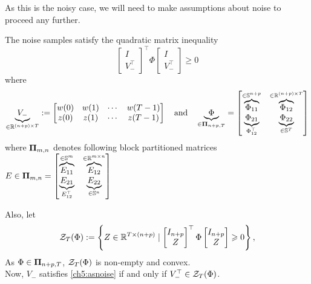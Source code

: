 As this is the noisy case, we will need to make assumptions about noise to proceed any further.
\begin{assumption} \label{ch5:assumption on noise samples}
The noise samples satisfy the quadratic matrix inequality
\begin{equation} 
    \label{ch5:asnoise}
    \begin{bmatrix}
    I \\ V_-^\top 
    \end{bmatrix}^\top 
    \Phi
    \begin{bmatrix}
    I \\ V_-^\top 
    \end{bmatrix} \geq 0
\end{equation}
where
\begin{equation} \label{ch5:eq:Phi}
\underbrace{V_-}_{\in\mathbb{R}^{(n+p)\times T}} := \bbm w(0) & w(1) & \cdots & w(T-1) \\  z(0) & z(1)  & \cdots & z(T-1)    \ebm \quad\text{and}\quad\underbrace{\Phi}_{\in \bpi_{n +p, T}} = \bbm \overbrace{\Phi_{11}}^{\in \S{n + p}}  & \overbrace{\Phi_{12}}^{\in \mathbb{R}^{(n + p) \times T}} \\ \underbrace{\Phi_{21}}_{\Phi_{12}^\top} & \underbrace{\Phi_{22}}_{\in \S{T}} \ebm
\end{equation}
where $\mathbf{\Pi}_{m,n}$ denotes following block partitioned matrices $E\in\mathbf{\Pi}_{m,n}=\begin{bmatrix} \overbrace{E_{11}}^{\in \mathbb{S}^{m}}  & \overbrace{E_{12}}^{\in \mathbb{R}^{m \times n}} \\ \underbrace{E_{21}}_{E_{12}^\top} & \underbrace{E_{22}}_{\in \mathbb{S}^{n}} \end{bmatrix}$

Also, let
\begin{equation} \label{ch0:e:Zr}
\calZ_{T}(\Phi):=\left\{ Z\in\R^{T\times {(n+p)}} \mid \bbm I_{n+p}\\Z\ebm^\top\Phi\bbm I_{n+p}\\Z\ebm\geq 0\right\},
\end{equation}
As $\Phi \in \mathbf{\Pi}_{n + p,T}$, $\mathcal{Z}_T(\Phi)$ is non-empty and convex.\\
Now,  $V_-$ satisfies \eqref{ch5:asnoise} if and only if $V_-^\top \in \mathcal{Z}_T(\Phi)$.
\end{assumption}

